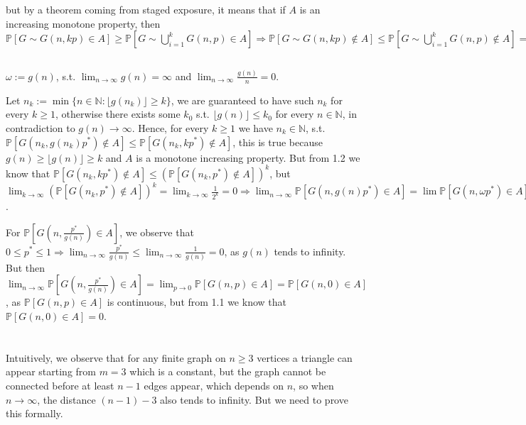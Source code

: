 \documentclass{article}
\begin{document}
but by a theorem coming from staged exposure, it means that if $A$ is an increasing monotone property, then $\mathbb{P}[G\sim{G(n,kp)}\in{A}]\geq{\mathbb{P}[G\sim\bigcup_{i=1}^{k}G(n,p)\in{A}]}\Rightarrow{\mathbb{P}[G\sim{G(n,kp)}\notin{A}]\leq{\mathbb{P}[G\sim\bigcup_{i=1}^{k}G(n,p)\notin{A}]}=(\mathbb{P}[G\sim{G(n,p)}\notin{A}]})^k$

\subsection{}
$\omega:=g(n)$, s.t. $\lim_{n\rightarrow\infty}g(n)=\infty$ and $\lim_{n\rightarrow\infty}\frac{g(n)}{n}=0$.

Let $n_k:=\min\{n\in\mathbb{N} : \lfloor{g(n_k)}\rfloor\geq{k}\}$, we are guaranteed to have such $n_k$ for every $k\geq{1}$, otherwise there exists some $k_0$ s.t. $\lfloor{g(n)}\rfloor\leq{k_0}$ for every $n\in\mathbb{N}$, in contradiction to $g(n)\rightarrow\infty$. 
Hence, for every $k\geq{1}$ we have $n_k\in\mathbb{N}$, s.t. $\mathbb{P}[G(n_k,g(n_k)p^{\ast})\notin{A}]\leq{\mathbb{P}[G(n_k,kp^{\ast})\notin{A}]}$, this is true because $g(n)\geq\lfloor{g(n)}\rfloor\geq{k}$ and $A$ is a monotone increasing property. But from 1.2 we know that $\mathbb{P}[G(n_k,kp^{\ast})\notin{A}]\leq{(\mathbb{P}[G(n_k,p^{\ast})\notin{A}])^k}$, but $\lim_{k\rightarrow\infty}(\mathbb{P}[G(n_k,p^{\ast})\notin{A}])^k=\lim_{k\rightarrow\infty}\frac{1}{2^k}=0\Rightarrow{\lim_{n\rightarrow\infty}\mathbb{P}[G(n,g(n){p^{\ast}})\in{A}]}=\lim\mathbb{P}[G(n,\omega{p^{\ast}})\in{A}]=1$.

For $\mathbb{P}[G(n,\frac{p^{\ast}}{g(n)})\in{A}]$, we observe that $0\leq{p^{\ast}}\leq{1}\Rightarrow{\lim_{n\rightarrow\infty}\frac{p^{\ast}}{g(n)}}\leq{\lim_{n\rightarrow\infty}\frac{1}{g(n)}}=0$, as $g(n)$ tends to infinity.
But then $\lim_{n\rightarrow\infty}\mathbb{P}[G(n,\frac{p^{\ast}}{g(n)})\in{A}]=\lim_{p\rightarrow{0}}\mathbb{P}[G(n,p)\in{A}]=\mathbb{P}[G(n,0)\in{A}]$, as $\mathbb{P}[G(n,p)\in{A}]$ is continuous, but from 1.1 we know that $\mathbb{P}[G(n,0)\in{A}]=0$.

\section{}
Intuitively, we observe that for any finite graph on $n\geq{3}$ vertices a triangle can appear starting from $m=3$ which is a constant, but the graph cannot be connected before at least $n-1$ edges appear, which depends on $n$, so when $n\rightarrow\infty$, the distance $(n-1)-3$ also tends to infinity. But we need to prove this formally.
\end{document}
